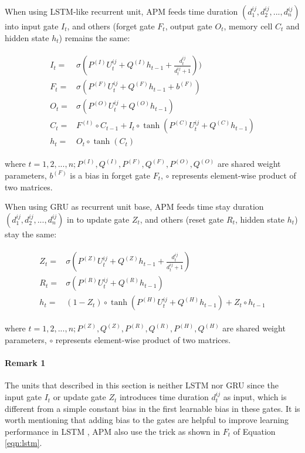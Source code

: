 When using LSTM-like recurrent unit, APM feeds time duration $(d^{ij}_1, d^{ij}_2, ..., d^{ij}_n)$
into input gate $I_t$, and others (forget gate $F_t$, output gate $O_t$, 
memory cell $C_t$ and hidden state $h_t$) remains the same:

\begin{align}
\label{eqn:lstm}
\begin{split}
    I_t =& \sigma ( P^{(I)} U^{ij}_t + Q^{(I)} h_{t-1} + \frac{d^{ij}_t}{d^{ij}_t + 1}) ) \\
    F_t =& \sigma ( P^{(F)} U^{ij}_t + Q^{(F)} h_{t-1} + b^{(F)}) \\
    O_t =& \sigma ( P^{(O)} U^{ij}_t + Q^{(O)} h_{t-1} ) \\
    C_t =& F^{(t)} \circ C_{t-1} + I_t \circ \tanh (P^{(C)} U^{ij}_t + Q^{(C)} h_{t-1}) \\
    h_t =& O_t \circ \tanh (C_t)
\end{split}
\end{align}

where $t = 1, 2, ..., n; P^{(I)}, Q^{(I)}, P^{(F)}, Q^{(F)}, P^{(O)}, Q^{(O)}$ are shared weight parameters, 
$b^{(F)}$ is a bias in forget gate $F_t$, $\circ$ represents element-wise product of two matrices.

When using GRU as recurrent unit base, APM feeds time stay duration $(d^{ij}_1, d^{ij}_2, ..., d^{ij}_n)$
in to update gate $Z_t$, and others (reset gate $R_t$, hidden state $h_t$) stay the same:

\begin{align}
\label{eqn:gru}
\begin{split}
    Z_t =& \sigma ( P^{(Z)} U^{ij}_t + Q^{(Z)} h_{t-1} + \frac{d^{ij}_t}{d^{ij}_t + 1} ) \\
    R_t =& \sigma ( P^{(R)} U^{ij}_t + Q^{(R)} h_{t-1} ) \\
    h_t =& ( 1 - Z_t ) \circ \tanh ( P^{(H)} U^{ij}_t + Q^{(H)} h_{t-1} ) + Z_t \circ h_{t-1}
\end{split}
\end{align}

where $t = 1, 2, ..., n; P^{(Z)}, Q^{(Z)}, P^{(R)}, Q^{(R)}, P^{(H)}, Q^{(H)}$ are shared weight parameters, 
$\circ$ represents element-wise product of two matrices.

\paragraph{Remark 1} The units that described in this section is neither LSTM nor GRU since
the input gate $I_t$ or update gate $Z_t$ introduces time duration $d^{ij}_t$ as input,
which is different from a simple constant bias in the first learnable bias in these gates. 
It is worth mentioning that adding bias to the gates are helpful to 
improve learning performance in LSTM \cite{Jozefowicz:2015:EER:3045118.3045367}, 
APM also use the trick as shown in $F_t$ of Equation \ref{eqn:lstm}.

